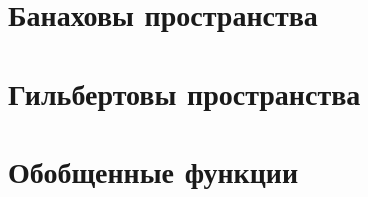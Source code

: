 
\section{Банаховы пространства}





% 






\section{Гильбертовы пространства}






\section{Обобщенные функции}












% 

%  
%  
% 
% 
% 



% 



